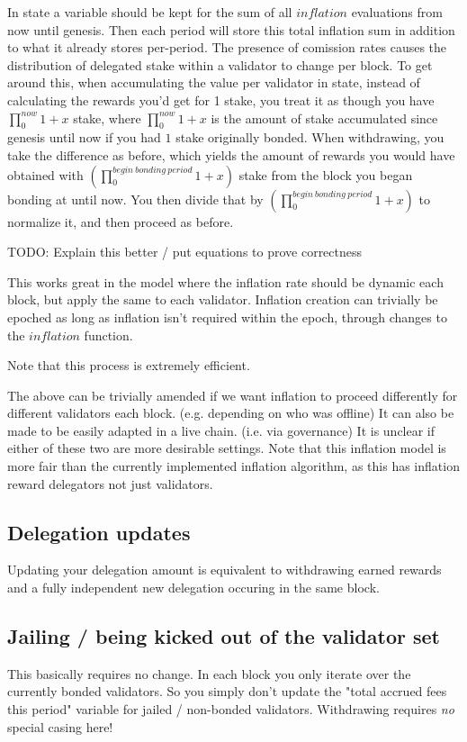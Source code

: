 \documentclass[]{article}
\begin{document}
In state a variable should be kept for the sum of all $inflation$ evaluations from now until genesis.
Then each period will store this total inflation sum in addition to what it already stores per-period.
The presence of comission rates causes the distribution of delegated stake within a validator to change per block.
To get around this, when accumulating the value per validator in state, instead of calculating the rewards you'd get for 1 stake, you treat it as though you have $\prod_0^{now} 1 + x$ stake, where $\prod_0^{now} 1 + x$ is the amount of stake accumulated since genesis until now if you had $1$ stake originally bonded.
When withdrawing, you take the difference as before, which yields the amount of rewards you would have obtained with $(\prod_0^{begin\ bonding\ period}1 + x)$ stake from the block you began bonding at until now. You then divide that by $(\prod_0^{begin\ bonding\ period}1 + x)$ to normalize it, and then proceed as before.

TODO: Explain this better / put equations to prove correctness

This works great in the model where the inflation rate should be dynamic each block, but apply the same to each validator.
Inflation creation can trivially be epoched as long as inflation isn't required within the epoch, through changes to the $inflation$ function.

Note that this process is extremely efficient.

The above can be trivially amended if we want inflation to proceed differently for different validators each block.
(e.g. depending on who was offline) It can also be made to be easily adapted in a live chain. (i.e. via governance) 
It is unclear if either of these two are more desirable settings.
Note that this inflation model is more fair than the currently implemented inflation algorithm, as this has inflation reward delegators not just validators.

\subsection{Delegation updates}
Updating your delegation amount is equivalent to withdrawing earned rewards and a fully independent new delegation occuring in the same block.

\subsection{Jailing / being kicked out of the validator set}
This basically requires no change.
In each block you only iterate over the currently bonded validators.
So you simply don't update the "total accrued fees this period" variable for jailed / non-bonded validators.
Withdrawing requires \textit{no} special casing here!
\end{document}
